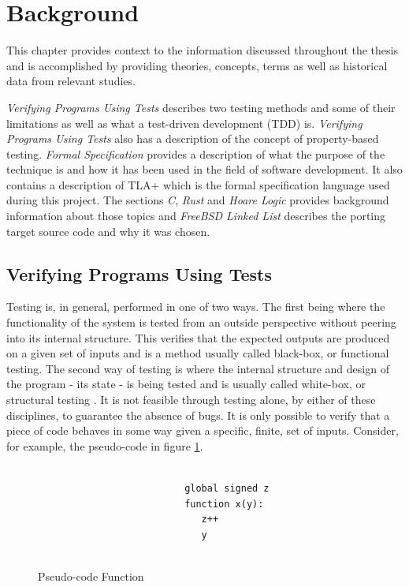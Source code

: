 \section{Background}\label{background}

This chapter provides context to the information discussed throughout the thesis and is accomplished by providing theories, concepts, terms as well as historical data from relevant studies.

\textit{Verifying Programs Using Tests} describes two testing methods and some of their limitations as well as what a test-driven development (TDD) is. \textit{Verifying Programs Using Tests} also has a description of the concept of property-based testing. \textit{Formal Specification} provides a description of what the purpose of the technique is and how it has been used in the field of software development. It also contains a description of TLA+ which is the formal specification language used during this project. The sections \textit{C}, \textit{Rust} and \textit{Hoare Logic} provides background information about those topics and \textit{FreeBSD Linked List} describes the porting target source code and why it was chosen.






\subsection{Verifying Programs Using Tests}\label{testing}


Testing is, in general, performed in one of two ways. The first being where the functionality of the system is tested from an outside perspective without peering into its internal structure. This verifies that the expected outputs are produced on a given set of inputs and is a method usually called black-box, or functional testing. The second way of testing is where the internal structure and design of the program - its state - is being tested and is usually called white-box, or structural testing \cite{comparison}. It is not feasible through testing alone, by either of these disciplines, to guarantee the absence of bugs. It is only possible to verify that a piece of code behaves in some way given a specific, finite, set of inputs. Consider, for example, the pseudo-code in figure \ref{fig:pseudocode}.
\begin{figure}[H]
 \vspace{12pt}
\begin{verbatim}
                          
                          global signed z
                          function x(y):
                             z++           
                             y
                            
\end{verbatim}
    \caption{Pseudo-code Function}
    \label{fig:pseudocode}
\end{figure}

